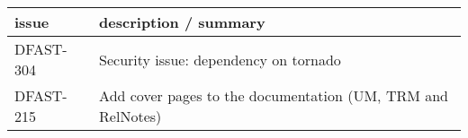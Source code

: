 \documentclass[git]{deltares_manual}
\begin{document}
\begin{adjustbox}{left=-0.25cm}
	\begin{tabular}{ l l } 
		issue & description / summary\\ \hline
		DFAST-304 & Security issue: dependency on tornado \\
		DFAST-215 & Add cover pages to the documentation (UM, TRM and RelNotes) \\
	\end{tabular}
\end{adjustbox}

\pagestyle{empty}
\cleardoublepage
\mbox{}
\end{document}
